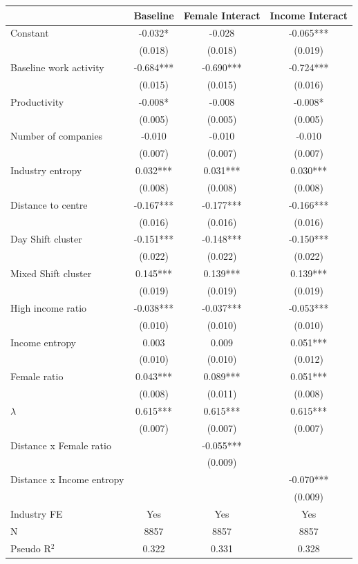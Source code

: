 \begin{tabular}{lccc}
\toprule
 & Baseline & Female Interact & Income Interact \\
\midrule
Constant & -0.032* & -0.028 & -0.065*** \\
 & (0.018) & (0.018) & (0.019) \\
Baseline work activity & -0.684*** & -0.690*** & -0.724*** \\
 & (0.015) & (0.015) & (0.016) \\
Productivity & -0.008* & -0.008 & -0.008* \\
 & (0.005) & (0.005) & (0.005) \\
Number of companies & -0.010 & -0.010 & -0.010 \\
 & (0.007) & (0.007) & (0.007) \\
Industry entropy & 0.032*** & 0.031*** & 0.030*** \\
 & (0.008) & (0.008) & (0.008) \\
Distance to centre & -0.167*** & -0.177*** & -0.166*** \\
 & (0.016) & (0.016) & (0.016) \\
Day Shift cluster & -0.151*** & -0.148*** & -0.150*** \\
 & (0.022) & (0.022) & (0.022) \\
Mixed Shift cluster & 0.145*** & 0.139*** & 0.139*** \\
 & (0.019) & (0.019) & (0.019) \\
High income ratio & -0.038*** & -0.037*** & -0.053*** \\
 & (0.010) & (0.010) & (0.010) \\
Income entropy & 0.003 & 0.009 & 0.051*** \\
 & (0.010) & (0.010) & (0.012) \\
Female ratio & 0.043*** & 0.089*** & 0.051*** \\
 & (0.008) & (0.011) & (0.008) \\
$\lambda$ & 0.615*** & 0.615*** & 0.615*** \\
 & (0.007) & (0.007) & (0.007) \\
Distance x Female ratio &  & -0.055*** &  \\
 &  & (0.009) &  \\
Distance x Income entropy &  &  & -0.070*** \\
 &  &  & (0.009) \\
\midrule
Industry FE & Yes & Yes & Yes \\
N & 8857 & 8857 & 8857 \\
Pseudo R$^2$ & 0.322 & 0.331 & 0.328 \\
\bottomrule
\end{tabular}